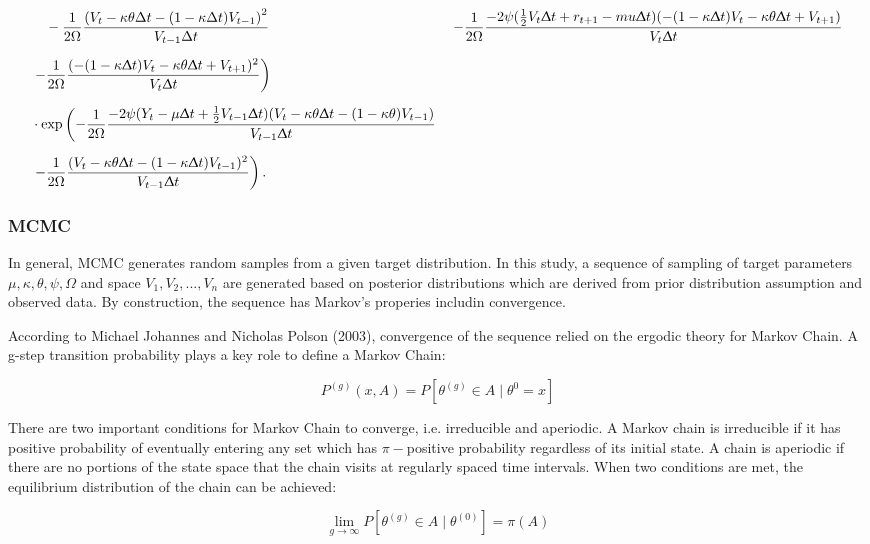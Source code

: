 \documentclass[12pt,a4paper]{article}
\numberwithin{equation}{section}
\begin{document}
\begin{align*}
&\quad - \frac{1}{2 \Omega} \frac{\left(V_t - \kappa \theta \Delta t - (1 - \kappa \Delta t) V_{t-1}\right)^2}{V_{t-1} \Delta t}
& \left. -\frac{1}{2 \Omega} \frac{-2\psi (\frac{1}{2}V_t \Updelta t + r_{t+1} -mu \Updelta t)(-(1-\kappa \Updelta t)V_t -\kappa \theta \Updelta t + V_{t+1})}{V_t \Updelta t} \right. \\[0.6em]
& \left. -\frac{1}{2 \Omega} \frac{(-(1-\kappa \Updelta t) V_t - \kappa \theta \Updelta t + V_{t+1})^2}{V_t \Updelta t} \right) \\[0.6em]
& \cdot \exp \left( - \frac{1}{2 \Omega} \frac{-2 \psi (Y_t - \mu \Updelta t + \frac{1}{2}V_{t-1} \Updelta t)(V_t - \kappa \theta \Updelta t - (1-\kappa \theta)V_{t-1})}{V_{t-1} \Updelta t} \right. \\[0.6em]
& \left. -\frac{1}{2 \Omega} \frac{(V_t - \kappa \theta \Updelta t - (1-\kappa\Updelta t)V_{t-1})^2}{V_{t-1}\Updelta t}\right).
\end{align*}

\subsubsection{MCMC}

In general, MCMC generates random samples from a given target distribution. In this study, a sequence of sampling of target parameters $\mu, \kappa, \theta, \psi, \Omega$ and space $V_1, V_2, ..., V_n$ are generated based on posterior distributions which are derived from prior distribution assumption and observed data. By construction, the sequence has Markov's properies includin convergence. 
 
According to Michael Johannes and Nicholas Polson (2003), convergence of the sequence relied on the ergodic theory for Markov Chain. A g-step transition probability plays a key role to define a Markov Chain:

\[P^{(g)} (x, A) = P[\theta^{(g)} \in A \mid \theta^0 = x]\]

There are two important conditions for Markov Chain to converge, i.e. irreducible and aperiodic. A Markov chain is irreducible if it has positive probability of eventually entering any set which has $\pi-$positive probability regardless of its initial state. A chain is aperiodic if there are no portions of the state space that the chain visits at regularly spaced time intervals. When two conditions are met, the equilibrium distribution of the chain can be achieved:

\[\lim_{g\rightarrow \infty} P[\theta^{(g)} \in A  \mid \theta^{(0)} ] = \pi(A)\]
\end{document}
